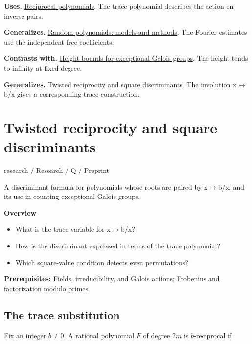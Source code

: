 \documentclass[11pt,a4paper,oneside,openany]{book}
\begin{document}
\color{black}\textbf{Uses.} \hyperlink{article:reciprocity}{Reciprocal polynomials}. The trace polynomial describes the action on inverse pairs.\par
\color{black}\textbf{Generalizes.} \hyperlink{article:random-models}{Random polynomials: models and methods}. The Fourier estimates use the independent free coefficients.\par
\color{black}\textbf{Contrasts with.} \hyperlink{article:height-counting}{Height bounds for exceptional Galois groups}. The height tends to infinity at fixed degree.\par
\color{black}\textbf{Generalizes.} \hyperlink{article:twisted-reciprocity}{Twisted reciprocity and square discriminants}. The involution x\ensuremath{\mapsto}b/x gives a corresponding trace construction.\par
\endgroup
\chapter{Twisted reciprocity and square discriminants}\label{article:twisted-reciprocity}\hypertarget{article:twisted-reciprocity}{}\color{black}
{\sffamily\small\color{atlasgold}research / Research / Q / Preprint}\par\medskip
A discriminant formula for polynomials whose roots are paired by x\ensuremath{\mapsto}b/x, and its use in counting exceptional Galois groups.\par\medskip
\textbf{Overview}\begin{itemize}
\item What is the trace variable for x\ensuremath{\mapsto}b/x?
\item How is the discriminant expressed in terms of the trace polynomial?
\item Which square-value condition detects even permutations?
\end{itemize}
{\small\textbf{Prerequisites:} \hyperlink{article:foundations}{Fields, irreducibility, and Galois actions}; \hyperlink{article:frobenius}{Frobenius and factorization modulo primes}}\par
{}\section{The trace substitution}
\color{black} Fix an integer \(b\ne0\). A rational polynomial \(F\) of degree \(2m\) is \(b\)-reciprocal if\par
\end{document}
